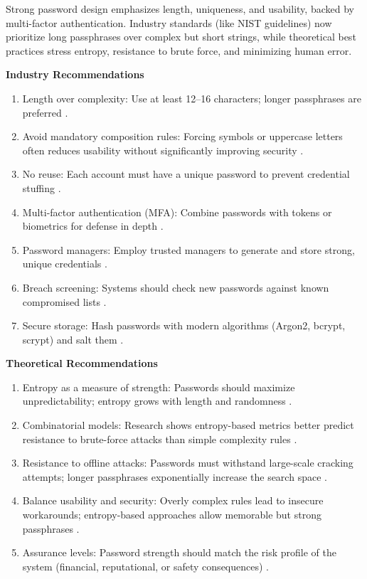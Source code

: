 \documentclass[a4paper, 18pt]{book} %
\begin{document}
{{{Strong password design emphasizes length, uniqueness, and usability, backed by multi-factor authentication. Industry standards (like NIST guidelines) now prioritize long passphrases over complex but short strings, while theoretical best practices stress entropy, resistance to brute force, and minimizing human error.

\vspace{1em}

\textbf{Industry Recommendations}
\begin{enumerate}
  \item Length over complexity: Use at least 12--16 characters; longer passphrases are preferred \cite{NIST2017}.
  \item Avoid mandatory composition rules: Forcing symbols or uppercase letters often reduces usability without significantly improving security \cite{NIST2017}.
  \item No reuse: Each account must have a unique password to prevent credential stuffing \cite{NIST2017}.
  \item Multi-factor authentication (MFA): Combine passwords with tokens or biometrics for defense in depth \cite{NIST2017}.
  \item Password managers: Employ trusted managers to generate and store strong, unique credentials \cite{NIST2017}.
  \item Breach screening: Systems should check new passwords against known compromised lists \cite{NIST2017}.
  \item Secure storage: Hash passwords with modern algorithms (Argon2, bcrypt, scrypt) and salt them \cite{NIST2017}.
\end{enumerate}

\vspace{1em}

\textbf{Theoretical Recommendations}
\begin{enumerate}
  \item Entropy as a measure of strength: Passwords should maximize unpredictability; entropy grows with length and randomness \cite{Chowdhury2023}.
  \item Combinatorial models: Research shows entropy-based metrics better predict resistance to brute-force attacks than simple complexity rules \cite{Chowdhury2023}.
  \item Resistance to offline attacks: Passwords must withstand large-scale cracking attempts; longer passphrases exponentially increase the search space \cite{Chowdhury2023}.
  \item Balance usability and security: Overly complex rules lead to insecure workarounds; entropy-based approaches allow memorable but strong passphrases \cite{Chowdhury2023}.
  \item Assurance levels: Password strength should match the risk profile of the system (financial, reputational, or safety consequences) \cite{Burr2003}.
\end{enumerate}

}}}
\end{document}
